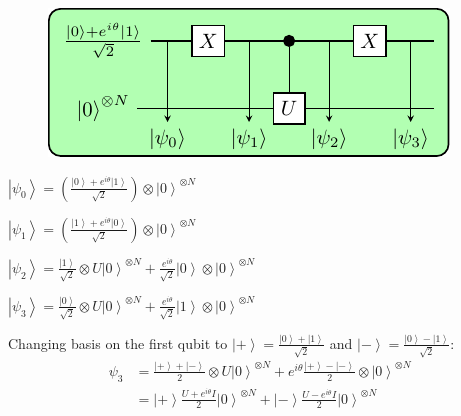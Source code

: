 \documentclass[professionalfonts]{beamer}
\newcommand{\ket}[1]{\ensuremath{\left|#1\right\rangle}}
\newcommand{\paren}[1]{\left( #1 \right)}
\newcommand{\elec}{N}
\begin{document}
\begin{frame}
\begin{overlayarea}{\textwidth}{\textheight}
{
\begin{figure}[ht!]
  \includegraphics[width=.75\linewidth]{../circuits/circuit1}
\end{figure}
}

\begin{itemize}
{
	\item \(
		\ket{\psi_0} 
		= \paren{\frac{\ket 0 + e^{i\theta}\ket 1}{\sqrt 2}}\otimes \ket 0^{\otimes\elec}
		\)
	\item \(
		\ket{\psi_1}
		= \paren{\frac{\ket 1 + e^{i\theta}\ket 0}{\sqrt 2}}\otimes \ket 0^{\otimes\elec} 
		\)
	\item \(
		\ket{\psi_2}
		= \frac{\ket 1}{\sqrt 2} \otimes U \ket 0^{\otimes\elec} + \frac{e^{i\theta}}{\sqrt 2}\ket 0 \otimes \ket 0^{\otimes\elec} 
		\)
  }
	{
	\item \(
		\ket{\psi_3}
		= \frac{\ket 0}{\sqrt 2} \otimes U \ket 0^{\otimes\elec} + \frac{e^{i\theta}}{\sqrt 2}\ket 1 \otimes \ket 0^{\otimes\elec} 
		\)
	}

	{
			Changing basis on the first qubit to 
			$\ket + = \frac{\ket 0 + \ket 1}{\sqrt 2}$
			and
			$\ket - = \frac{\ket 0 - \ket 1}{\sqrt 2}$:
			\begin{equation*}
				\begin{split}
					\psi_3
					&= \frac{\ket + + \ket -}{2} \otimes U \ket 0^{\otimes\elec} + e^{i\theta}\frac{\ket + - \ket -}{2} \otimes \ket 0^{\otimes\elec} \\
					&= \ket + \frac{U + e^{i\theta}I}{2}\ket 0^{\otimes\elec}
					+ \ket - \frac{U - e^{i\theta}I}{2}\ket 0^{\otimes\elec}
				\end{split}
			\end{equation*}
	}
\end{itemize}
\end{overlayarea}
\end{frame}
\end{document}
